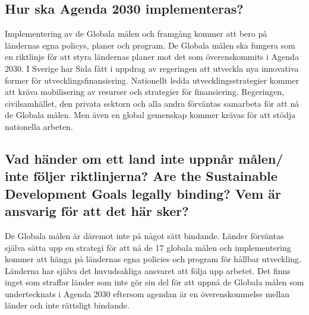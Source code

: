\documentclass{report}
\begin{document}
\subsection{Hur ska Agenda 2030 implementeras?} 
Implementering av de Globala målen och framgång kommer att bero på ländernas egna policys, planer och program. De Globala målen ska fungera som en riktlinje för att styra ländernas planer mot det som överenskommits i Agenda 2030. \cite{web2030agenda}
I Sverige har Sida fått i uppdrag av regeringen att utveckla nya innovativa former för utvecklingsfinansiering. \cite{webSIDA}
Nationellt ledda utvecklingsstrategier kommer att kräva mobilisering av resurser och strategier för finansiering. Regeringen, civilsamhället, den privata sektorn och alla andra förväntas samarbeta för att nå de Globala målen. Men även en global gemenskap kommer krävas för att stödja nationella arbeten.\cite{web2030agenda}\\

\subsection{Vad händer om ett land inte uppnår målen/ inte följer riktlinjerna? Are the Sustainable Development Goals legally binding? Vem är ansvarig för att det här sker?} 
De Globala målen är däremot inte på något sätt bindande. Länder förväntas själva sätta upp en strategi för att nå de 17 globala målen och implementering kommer att hänga på ländernas egna policies och program för hållbar utveckling. Länderna har själva det huvudsakliga ansvaret att följa upp arbetet. Det finns inget som straffar länder som inte gör sin del för att uppnå de Globala målen som undertecknats i Agenda 2030 eftersom agendan är en överenskommelse mellan länder och inte rättsligt bindande. \cite{web2030agenda}\\
\end{document}
